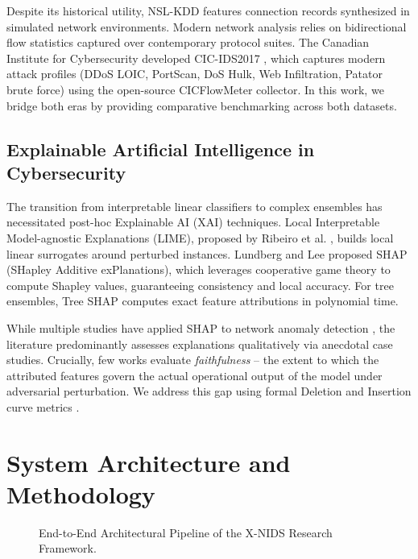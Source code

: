 \documentclass[conference]{IEEEtran}
\begin{document}
Despite its historical utility, NSL-KDD features connection records synthesized in simulated network environments. Modern network analysis relies on bidirectional flow statistics captured over contemporary protocol suites. The Canadian Institute for Cybersecurity developed CIC-IDS2017 \cite{sharafaldin2018toward}, which captures modern attack profiles (DDoS LOIC, PortScan, DoS Hulk, Web Infiltration, Patator brute force) using the open-source CICFlowMeter collector. In this work, we bridge both eras by providing comparative benchmarking across both datasets.

\subsection{Explainable Artificial Intelligence in Cybersecurity}

The transition from interpretable linear classifiers to complex ensembles has necessitated post-hoc Explainable AI (XAI) techniques. Local Interpretable Model-agnostic Explanations (LIME), proposed by Ribeiro et al. \cite{ribeiro2016should}, builds local linear surrogates around perturbed instances. Lundberg and Lee \cite{lundberg2017unified} proposed SHAP (SHapley Additive exPlanations), which leverages cooperative game theory to compute Shapley values, guaranteeing consistency and local accuracy. For tree ensembles, Tree SHAP \cite{lundberg2020local} computes exact feature attributions in polynomial time.

While multiple studies have applied SHAP to network anomaly detection \cite{wang2020explainable}, the literature predominantly assesses explanations qualitatively via anecdotal case studies. Crucially, few works evaluate \textit{faithfulness} -- the extent to which the attributed features govern the actual operational output of the model under adversarial perturbation. We address this gap using formal Deletion and Insertion curve metrics \cite{petsiuk2018rise}.

\section{System Architecture and Methodology}

\begin{figure}[t]
\centering
{}
\caption{End-to-End Architectural Pipeline of the X-NIDS Research Framework.}
\label{fig:architecture}
\end{figure}
\end{document}
